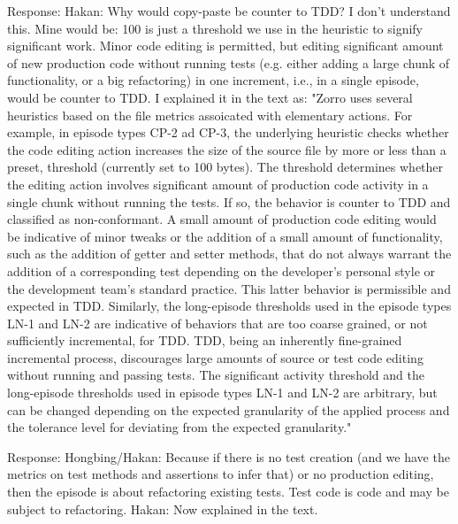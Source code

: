 \documentclass[11pt]{article}
\begin{document}
\noindent Response: Hakan: Why would copy-paste be counter to TDD? I don't understand this. Mine would be: 100 is just a threshold we use in the heuristic to signify significant work. Minor code editing is permitted, but editing significant amount of new production code without running tests (e.g. either adding a large chunk of functionality, or a big refactoring) in one increment, i.e., in a single episode, would be counter to TDD. I explained it in the text as: "Zorro uses several heuristics based on the file metrics assoicated with elementary actions. For example, in episode types CP-2 ad CP-3, the underlying heuristic checks whether the code editing action increases the size of the source file by more or less than a preset, threshold (currently set to 100 bytes). The threshold determines whether the editing action involves significant amount of production code activity in a single chunk without running the tests. If so, the behavior is counter to TDD and classified as non-conformant. A small amount of production code editing would be indicative of minor tweaks or the addition of a small amount of functionality, such as the addition of getter and setter methods, that do not always warrant the addition of a corresponding test depending on the developer's personal style or the development team's standard practice. This latter behavior is permissible and expected in TDD. Similarly, the long-episode thresholds used in the episode types LN-1 and LN-2 are  indicative of behaviors that are too coarse grained, or not sufficiently incremental, for TDD. TDD, being an inherently fine-grained incremental process, discourages large amounts of source or test code editing without running and passing tests.   The significant activity threshold and the long-episode thresholds used in episode types LN-1 and LN-2 are arbitrary, but can be changed depending on the expected granularity of the applied process and the tolerance level for deviating from the expected granularity."


\noindent Response: Hongbing/Hakan: Because if there is no test creation (and we have the metrics
on test methods and assertions to infer that) or no production editing, then the episode is about refactoring existing tests. Test code is code and may be subject to refactoring. Hakan: Now explained in the text. 

\end{document}
